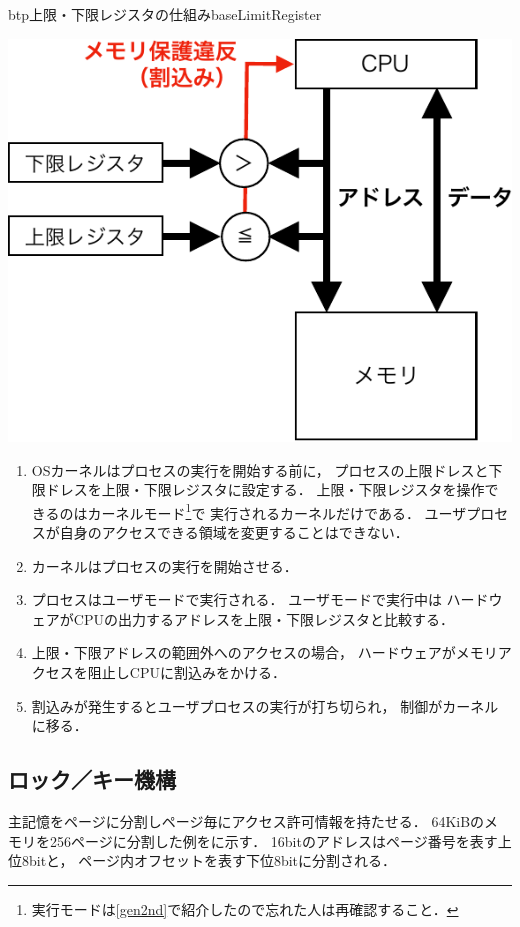 \begin{myfig}{btp}{上限・下限レジスタの仕組み}{baseLimitRegister}
\begin{minipage}{0.49\columnwidth}
\begin{center}
      \includegraphics[scale=0.6]{Fig/baseLimitHardware-crop.pdf}
      \label{fig:baseLimitHardware}
    \end{center}
  \end{minipage}
\end{myfig}

\begin{enumerate}
\item OSカーネルはプロセスの実行を開始する前に，
  プロセスの上限ドレスと下限ドレスを上限・下限レジスタに設定する．
  上限・下限レジスタを操作できるのはカーネルモード\footnote{
    実行モードは\ref{gen2nd}で紹介したので忘れた人は再確認すること．}で
  実行されるカーネルだけである．
  ユーザプロセスが自身のアクセスできる領域を変更することはできない．
\item カーネルはプロセスの実行を開始させる．
\item プロセスはユーザモードで実行される．
  ユーザモードで実行中は
  ハードウェアがCPUの出力するアドレスを上限・下限レジスタと比較する．
\item 上限・下限アドレスの範囲外へのアクセスの場合，
  ハードウェアがメモリアクセスを阻止しCPUに割込みをかける．
\item 割込みが発生するとユーザプロセスの実行が打ち切られ，
  制御がカーネルに移る．
\end{enumerate}

\subsection{ロック／キー機構}
主記憶をページに分割しページ毎にアクセス許可情報を持たせる．
64KiBのメモリを256ページに分割した例をに示す．
16bitのアドレスはページ番号を表す上位8bitと，
ページ内オフセットを表す下位8bitに分割される．

